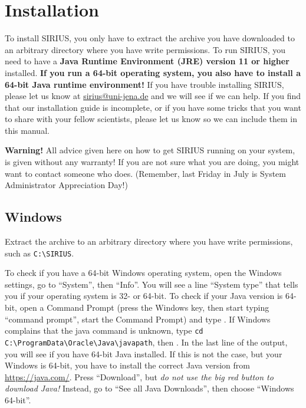 \documentclass[letterpaper,10pt,openany,oneside]{sphinxmanual}
\begin{document}

\chapter{Installation}
\label{install:installation}\label{install::doc}\label{install:user-interface}

To install SIRIUS, you only have to extract the archive you have downloaded
to an arbitrary directory where you have write permissions.  To run SIRIUS,
you need to have a \textbf{Java Runtime Environment (JRE) version 11 or
higher} installed.  \textbf{If you run a 64-bit operating system, you also
have to install a 64-bit Java runtime environment!}  If you have trouble
installing SIRIUS, please let us know at \url{sirius@uni-jena.de} and we will
see if we can help.  If you find that our installation guide is incomplete,
or if you have some tricks that you want to share with your fellow
scientists, please let us know so we can include them in this manual.

\textbf{Warning!}  All advice given here on how to get SIRIUS running on your
system, is given without any warranty!  If you are not sure what you are
doing, you might want to contact someone who does.  (Remember, last Friday in
July is System Administrator Appreciation Day!)



\section{Windows}
\label{install:windows}

Extract the archive to an arbitrary directory where you have write
permissions, such as \verb|C:\SIRIUS|.

To check if you have a 64-bit Windows operating system, open the Windows
settings, go to ``System'', then ``Info''.  You will see a line ``System
type'' that tells you if your operating system is 32- or 64-bit.  To check if
your Java version is 64-bit, open a Command Prompt (press the Windows key,
then start typing ``command prompt'', start the Command Prompt) and
type .  If Windows complains that the java command is
unknown, type
\verb!cd C:\ProgramData\Oracle\Java\javapath!,
then .  In the last line of the output, you will see if
you have 64-bit Java installed.  If this is not the case, but your Windows is
64-bit, you have to install the correct Java version
from \url{https://java.com/}.  Press ``Download'', but \emph{do not use the
big red button to download Java!}  Instead, go to ``See all Java Downloads'',
then choose ``Windows 64-bit''.
\end{document}
